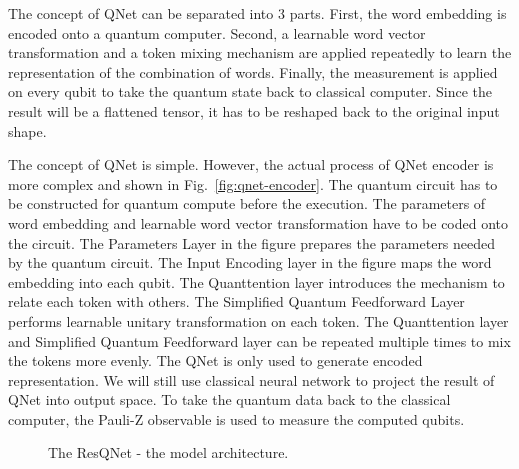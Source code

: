 The concept of QNet can be separated into 3 parts. First, the word embedding is encoded onto a quantum computer. Second, a learnable word vector transformation and a token mixing mechanism are applied repeatedly to learn the representation of the combination of words. Finally, the measurement is applied on every qubit to take the quantum state back to classical computer. Since the result will be a flattened tensor, it has to be reshaped back to the original input shape.

The concept of QNet is simple. However, the actual process of QNet encoder is more complex and shown in Fig.~\ref{fig:qnet-encoder}. The quantum circuit has to be constructed for quantum compute before the execution. The parameters of word embedding and learnable word vector transformation have to be coded onto the circuit. The Parameters Layer in the figure prepares the parameters needed by the quantum circuit. The Input Encoding layer in the figure maps the word embedding into each qubit. The Quanttention layer introduces the mechanism to relate each token with others. The Simplified Quantum Feedforward Layer performs learnable unitary transformation on each token. The Quanttention layer and Simplified Quantum Feedforward layer can be repeated multiple times to mix the tokens more evenly. The QNet is only used to generate encoded representation. We will still use classical neural network to project the result of QNet into output space. To take the quantum data back to the classical computer, the Pauli-Z observable is used to measure the computed qubits.

\begin{figure}[htp]
  \centering
  \caption{The ResQNet - the model architecture.}
  \label{fig:resqnet}
\end{figure}

